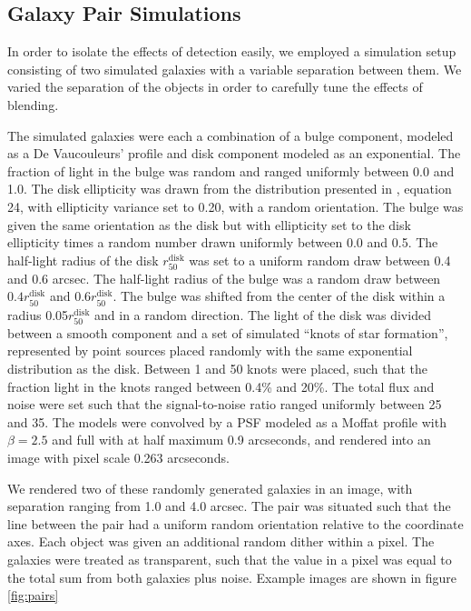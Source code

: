 \documentclass[fleqn,useAMS,usenatbib]{mnras}
\begin{document}
\subsection{Galaxy Pair Simulations}
\label{sec:sims:pairs}

In order to isolate the effects of detection easily, we employed a simulation
setup consisting of two simulated galaxies with a variable separation between
them.  We varied the separation of the objects in order to carefully tune the
effects of blending.

The simulated galaxies were each a combination of a bulge component, modeled as
a De Vaucouleurs' profile \citep{devauc1948} and disk component modeled as an
exponential. The fraction of light in the bulge was random and ranged uniformly
between 0.0 and 1.0. The disk ellipticity was drawn from the distribution
presented in \cite{ba14}, equation 24, with ellipticity variance set to 0.20,
with a random orientation. The bulge was given the same orientation as the disk
but with ellipticity set to the disk ellipticity times a random number drawn
uniformly between 0.0 and 0.5. The half-light radius of the disk
$r_{50}^{\mathrm{disk}}$ was set to a uniform random draw between 0.4 and 0.6
arcsec. The half-light radius of the bulge was a random draw between $0.4
r_{50}^{\mathrm{disk}}$ and $0.6 r_{50}^{\mathrm{disk}}$. The bulge was shifted
from the center of the disk within a radius 0.05$r_{50}^{\mathrm{disk}}$ and in
a random direction. The light of the disk was divided between a smooth
component and a set of simulated ``knots of star formation'', represented by
point sources placed randomly with the same exponential distribution as the
disk.  Between 1 and 50 knots were placed, such that the fraction light in the
knots ranged between 0.4\% and 20\%. The total flux and noise were set such
that the signal-to-noise ratio ranged uniformly between 25 and 35.  The models
were convolved by a PSF modeled as a Moffat profile with $\beta=2.5$ and full
with at half maximum 0.9 arcseconds, and rendered into an image with pixel
scale 0.263 arcseconds.

We rendered two of these randomly generated galaxies in an image, with
separation ranging from 1.0 and 4.0 arcsec. The pair was situated such that the
line between the pair had a uniform random orientation relative to the
coordinate axes. Each object was given an additional random dither within a
pixel. The galaxies were treated as transparent, such that the value in a pixel
was equal to the total sum from both galaxies plus noise. Example images are
shown in figure \ref{fig:pairs}
\end{document}
